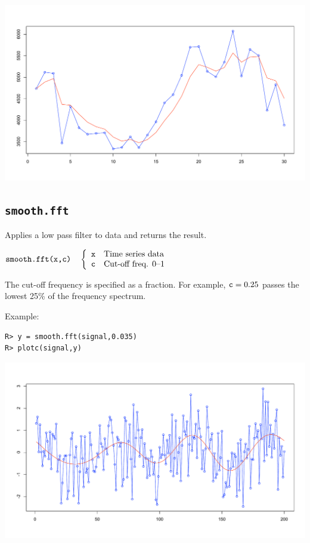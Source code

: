 \documentclass[11pt]{article}
\begin{document}
\begin{center}
\includegraphics[scale=0.3]{Rplot-11.pdf}
\end{center}

\newpage

\subsection{\tt smooth.fft}
Applies a low pass filter to data and returns the result.

\bigskip
$
\hbox{\tt smooth.fft(x,c)}\quad\left\{\begin{array}{ll}
{\tt x} & \hbox{Time series data}\\
{\tt c} & \hbox{Cut-off freq. 0--1}
\end{array}\right.
$

\bigskip
\noindent
The cut-off frequency is specified as a fraction.
For example, ${\tt c}=0.25$ passes the lowest 25\% of the frequency spectrum.

\bigskip
\noindent
Example:

\begin{verbatim}
R> y = smooth.fft(signal,0.035)
R> plotc(signal,y)
\end{verbatim}

\begin{center}
\includegraphics[scale=0.3]{Rplot-2.pdf}
\end{center}
\end{document}
